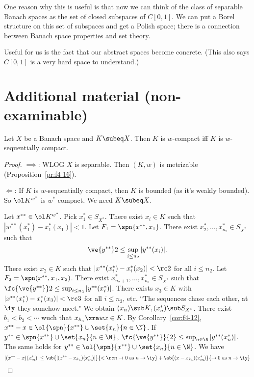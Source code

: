 One reason why this is useful is that now we can think of the class of separable Banach spaces as the set of closed subspaces of $C[0,1]$. We can put a Borel structure on this set of subspaces and get a Polish space; there is a connection between Banach space properties and set theory.

Useful for us is the fact that our abstract spaces become concrete. (This also says $C[0,1]$ is a very hard space to understand.)

\section{Additional material (non-examinable)}
\begin{thm} %
Let $X$ be a Banach space and $K\subeq X$. Then $K$ is $w$-compact iff $K$ is $w$-sequentially compact.
\end{thm}
\begin{proof}
$\implies$: 
WLOG $X$ is separable. Then $(K,w)$ is metrizable (Proposition~\ref{pr:f4-16}).

$\Leftarrow$: 
If $K$ is $w$-sequentially compact, then $K$ is bounded (as it's weakly bounded). So $\ol K^{w^*}$ is $w^*$ compact. We need $K\subeq X$.

Let $x^{**}\in \ol K^{w^*}$. Pick $x_1^*\in S_{X^*}$. There exist $x_i\in K$ such that $|w^{**}(x_1^*)-x_1^*(x_1)|<1$. Let $F_1=\spn\{x^{**}, x_1\}$.
There exist $x_2^*,\ldots, x_{n_2}^*\in S_{X^*}$ such that 
\[
\ve{y^{**}}2\le \sup_{i\le n_2} |y^{**}(x_i)|.
\]
There exist $x_2\in K$ such that $|x^{**}(x_i^*)-x_i^*(x_2)|<\rc 2$ for all $i\le n_2$. Let $F_2=\spn(x^{**},x_1,x_2)$. There exist $x_{n_2+1}^*,\ldots, x_{n_3}^*\in S_{X^*}$ such that $\fc{\ve{y^{**}}}2\le \sup_{i\le n_3} |y^{**}(x_i^*)|$. There exists $x_3\in K$  with $|x^{**}(x_i^*)-x_i^*(x_3)|<\rc3$ for all $i\le n_3$, etc. ``The sequences chase each other, at $\iy$ they somehow meet." We obtain $(x_n)\sub K, (x_n^*)\sub S_{X^*}$. There exist $b_1<b_2<\cdots$ wuch that $x_{k_n}\xra w x\in K$. By Corollary~\ref{cor:f4-12}, $x^{**}-x\in \ol{\spn}\{x^{**}\}\cup\set{ x_n}{n\in \N}$. If $y^{**}\in {\spn}\{x^{**}\}\cup\set{ x_n}{n\in \N}$, $\fc{\ve{y^{**}}}{2}\le \sup_{n\in \N}|y^{**}(x_n^*)|$. The same holds for $y^{**}\in \ol{\spn}\{x^{**}\}\cup\set{ x_n}{n\in \N}$. We have
\[
|(x^{**}-x)(x_m^*)|\le \ub{|(x^{**}-x_{k_n})(x_m^*)|}{<\rc n\to 0\text{ as }n\to \iy}+\ab{(x-x_{k_n})(x_m^*)}{\to 0\text{ as }n\to \iy}
\]
\end{proof}

